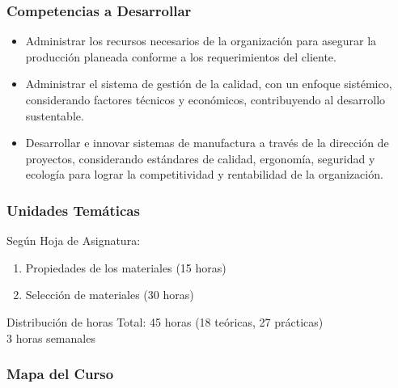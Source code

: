 \documentclass{beamer}
\begin{document}
\begin{frame}
    \frametitle{Competencias a Desarrollar}
   
   \begin{itemize}
      \item Administrar los recursos necesarios de la organización para asegurar la producción planeada conforme a los requerimientos del cliente.
      
      \item Administrar el sistema de gestión de la calidad, con un enfoque sistémico, considerando factores técnicos y económicos, contribuyendo al desarrollo sustentable.
      
      \item Desarrollar e innovar sistemas de manufactura a través de la dirección de proyectos, considerando estándares de calidad, ergonomía, seguridad y ecología para lograr la competitividad y rentabilidad de la organización.
   \end{itemize}
   
\end{frame}

\begin{frame}
    \frametitle{Unidades Temáticas}
    Según Hoja de Asignatura:
    \begin{enumerate}
    	\item Propiedades de los materiales (15 horas)
    	\item Selección de materiales (30 horas)
    \end{enumerate}
    
    \vspace{0.5cm}
    
    \begin{alertblock}{Distribución de horas}
        \centering
        Total: 45 horas (18 teóricas, 27 prácticas)\\
        3 horas semanales
    \end{alertblock}
    
\end{frame}

\begin{frame}[plain]
	\frametitle{Mapa del Curso}
	
\end{frame}
\end{document}
